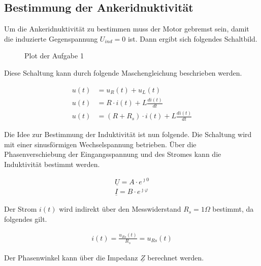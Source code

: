 \subsection{Bestimmung der Ankeridnuktivität}

Um die Ankeridnuktivität zu bestimmen muss der Motor gebremst sein,
damit die induzierte Gegenspannung $U_{ind} = 0$ ist. Dann ergibt sich
folgendes Schaltbild.


\begin{figure}[H]
    \centering
    \caption{Plot der Aufgabe 1}
    \label{fig:PlotAufgabe1}
   \end{figure}

Diese Schaltung kann durch folgende Maschengleichung beschrieben werden.

\begin{equation} \label{eq211}
    \begin{split}
        u(t)&=u_R(t) + u_L(t)\\
        u(t)&=R \cdot i(t) + L \frac{d i(t)}{dt}\\
        u(t)&= (R+R_s) \cdot i(t) + L \frac{d i(t)}{dt}
    \end{split}
\end{equation}

Die Idee zur Bestimmung der Induktivität ist nun folgende. Die Schaltung
wird mit einer sinusförmigen Wechselspannung betrieben. Über die
Phasenverschiebung der Eingangsspannung und des Stromes kann die Induktivität
bestimmt werden.

\begin{equation} \label{eq212}
    \begin{split}
        \underline{U} = A \cdot e^{\jmath 0}\\
        \underline{I} = B \cdot e^{\jmath \varphi}
    \end{split}
\end{equation}

Der Strom $i(t)$ wird indirekt über den Messwiderstand $R_s= 1\Omega$
bestimmt, da folgendes gilt.

\begin{equation} \label{eq213}
    \begin{split}
        i(t)=\frac{u_{Rs}(t)}{R_s} = u_{Rs}(t)
    \end{split}
\end{equation}

Der Phasenwinkel kann über die Impedanz $\underline{Z}$ berechnet werden.

